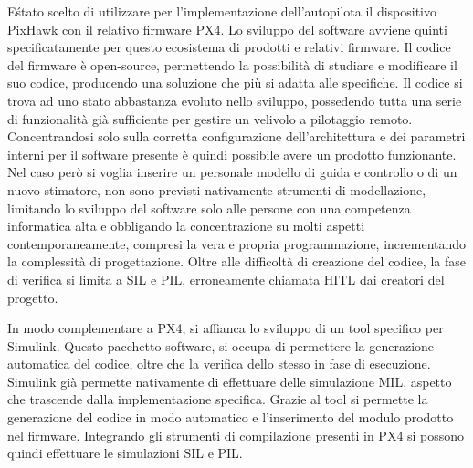 E\' stato scelto di utilizzare per l'implementazione dell'autopilota il dispositivo PixHawk con il relativo firmware PX4. Lo sviluppo del software avviene quinti specificatamente per questo ecosistema di prodotti e relativi firmware. Il codice del firmware è open-source, permettendo la possibilità di studiare e modificare il suo codice, producendo una soluzione che più si adatta alle specifiche. Il codice si trova ad uno stato abbastanza evoluto nello sviluppo, possedendo tutta una serie di funzionalità già sufficiente per gestire un velivolo a pilotaggio remoto. Concentrandosi solo sulla corretta configurazione dell'architettura e dei parametri interni per il software presente è quindi possibile avere un prodotto funzionante. Nel caso però si voglia inserire un personale modello di guida e controllo o di un nuovo stimatore, non sono previsti nativamente strumenti di modellazione, limitando lo sviluppo del software solo alle persone con una competenza informatica alta e obbligando la concentrazione su molti aspetti contemporaneamente, compresi la  vera e propria programmazione, incrementando la complessità di progettazione. Oltre alle difficoltà di creazione del codice, la fase di verifica si limita a SIL e PIL, erroneamente chiamata HITL dai creatori del progetto.

In modo complementare a PX4, si affianca lo sviluppo di un tool specifico per Simulink. Questo pacchetto software, si occupa di permettere la generazione automatica del codice, oltre che la verifica dello stesso in fase di esecuzione. Simulink già permette nativamente di effettuare delle simulazione MIL, aspetto che trascende dalla implementazione specifica. Grazie al tool si permette la generazione del codice in modo automatico e l'inserimento del modulo prodotto nel firmware. Integrando gli strumenti di compilazione presenti in PX4 si possono quindi effettuare le simulazioni SIL e PIL.